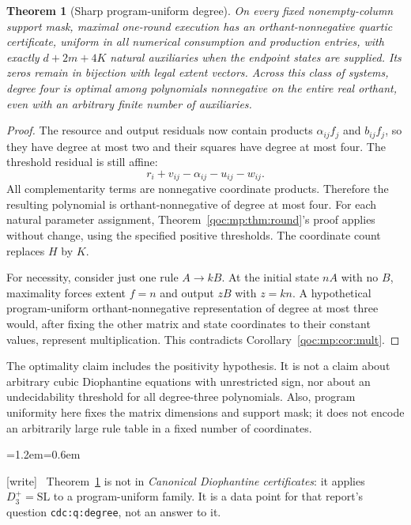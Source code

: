 \documentclass[11pt,letterpaper]{article}
\newtheorem{theorem}{Theorem}[section]
\theoremstyle{definition}
\theoremstyle{remark}
\newcommand{\wtag}{\textup{[write]}}
\newenvironment{writenote}{\par\smallskip\begin{list}{}{\leftmargin=1.2em\rightmargin=0.6em}\item[]\small\wtag\ }{\end{list}\smallskip}
\newcommand{\lab}[1]{\nolinkurl{#1}}
\newcommand{\Dplus}{D^{+}}
\begin{document}
\begin{theorem}[Sharp program-uniform degree]\label{qoc:mp:thm:programdegree}
On every fixed nonempty-column support mask, maximal one-round execution
has an orthant-nonnegative quartic certificate, uniform in all numerical
consumption and production entries, with exactly $d+2m+4K$ natural
auxiliaries when the endpoint states are supplied. Its zeros remain in
bijection with legal extent vectors. Across this class of systems,
degree four is optimal among polynomials nonnegative on the entire real
orthant, even with an arbitrary finite number of auxiliaries.
\end{theorem}
\begin{proof}
The resource and output residuals now contain products
$\alpha_{ij}f_j$ and $b_{ij}f_j$, so they have degree at most two and their
squares have degree at most four. The threshold residual is still affine:
\[
 r_i+v_{ij}-\alpha_{ij}-u_{ij}-w_{ij}.
\]
All complementarity terms are nonnegative coordinate products. Therefore
the resulting polynomial is orthant-nonnegative of degree at most four.
For each natural parameter assignment, Theorem~\ref{qoc:mp:thm:round}'s proof
applies without change, using the specified positive thresholds. The
coordinate count replaces $H$ by $K$.

For necessity, consider just one rule $A\to kB$. At the initial state
$nA$ with no $B$, maximality forces extent $f=n$ and output $zB$ with
$z=kn$. A hypothetical program-uniform orthant-nonnegative representation
of degree at most three would, after fixing the other matrix and state
coordinates to their constant values, represent multiplication. This
contradicts Corollary~\ref{qoc:mp:cor:mult}.
\end{proof}

The optimality claim includes the positivity hypothesis. It is not a
claim about arbitrary cubic Diophantine equations with unrestricted sign,
nor about an undecidability threshold for all degree-three polynomials.
Also, program uniformity here fixes the matrix dimensions and support
mask; it does not encode an arbitrarily large rule table in a fixed
number of coordinates.

\begin{writenote}
Theorem~\ref{qoc:mp:thm:programdegree} is not in \emph{Canonical Diophantine certificates}: it applies $\Dplus_3=\mathrm{SL}$ to a program-uniform family. It is a data point for that report's question \lab{cdc:q:degree}, not an answer to it.
\end{writenote}
\end{document}
